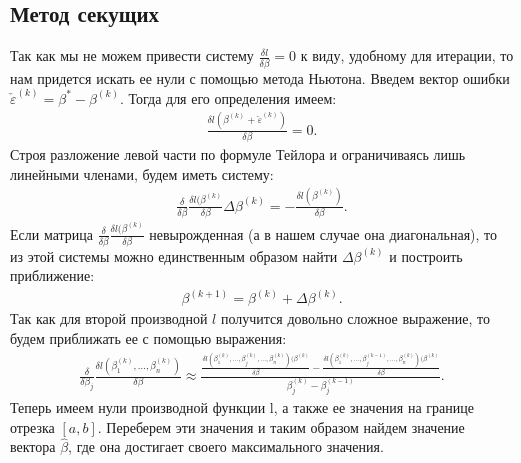\documentclass[12pt]{article}
\begin{document}
\subsection{Метод секущих}
Так как мы не можем привести систему $ \frac{\delta l}{\delta \beta}=0$ к виду, удобному для итерации, то нам придется искать ее нули с помощью метода Ньютона.
Введем вектор ошибки $\check{\varepsilon}^{(k)}=\beta^{*}-\beta^{(k)}$. Тогда для его определения имеем:
\begin{eqnarray}
    \frac{\delta l (\beta^{(k)}+\check{\varepsilon}^{(k)})}{\delta \beta}=0.
\end{eqnarray}
Строя разложение левой части по формуле Тейлора и ограничиваясь лишь линейными членами\cite{NumericalMethods}, будем иметь систему:
\begin{eqnarray}
    \frac{\delta }{\delta \beta}\frac{\delta l (\beta^{(k)}}{\delta \beta}\Delta \beta^{(k)}=-\frac{\delta l (\beta^{(k)})}{\delta \beta}.
\end{eqnarray}
Если матрица $\frac{\delta }{\delta \beta}\frac{\delta l (\beta^{(k)}}{\delta \beta}$ невырожденная (а в нашем случае она диагональная), то из этой системы можно единственным образом найти $\Delta \beta^{(k)}$ и построить приближение:
\begin{eqnarray}
    \beta^{(k+1)}=\beta^{(k)}+\Delta \beta^{(k)}.
\end{eqnarray}
Так как для второй производной $l$ получится довольно сложное выражение, то будем приближать ее с помощью выражения:
\begin{eqnarray}
    \frac{\delta }{\delta \beta_j}\frac{\delta l(\beta_1^{(k)},\dots, \beta_n^{(k)}) }{\delta \beta}\approx \frac{\frac{\delta l(\beta_1^{(k)},\dots,\beta_j^{(k)},\dots, \beta_n^{(k)}) (\beta^{(k)}}{\delta \beta}-\frac{\delta l(\beta_1^{(k)},\dots,\beta_j^{(k-1)},\dots, \beta_n^{(k)}) (\beta^{(k)}}{\delta \beta}}{\beta_j^{(k)}-\beta_j^{(k-1)}}.
\end{eqnarray}
Теперь имеем нули производной функции l, а также ее значения на границе отрезка $[a,b]$.
Переберем эти значения и таким образом найдем значение вектора $\hat{\beta}$, где она достигает своего максимального значения.
\end{document}
